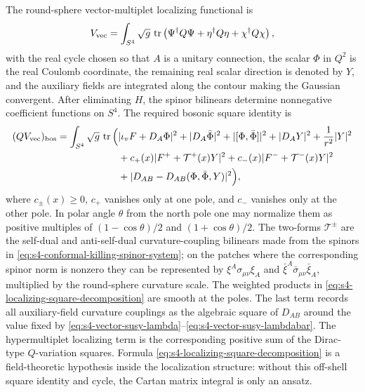 \begin{hypothesis}
\label{hyp:s4-pestun-localizing-cycle}
The round-sphere vector-multiplet localizing functional is
\begin{equation}
  V_{\rm vec}
  =
  \int_{S^4}\sqrt g\,\operatorname{tr}
  \left(
    \Psi^\dagger Q\Psi+\eta^\dagger Q\eta+\chi^\dagger Q\chi
  \right),
  \label{eq:s4-vector-localizing-functional}
\end{equation}
with the real cycle chosen so that \(A\) is a unitary connection, the scalar
\(\Phi\) in \(Q^2\) is the real Coulomb coordinate, the remaining real scalar
direction is denoted by \(Y\), and the auxiliary fields are integrated along
the contour making the Gaussian convergent.  After eliminating \(H\), the
spinor bilinears determine nonnegative coefficient functions on \(S^4\).
The required bosonic square identity is
\begin{equation}
\begin{aligned}
  (QV_{\rm vec})_{\rm bos}
  =
  \int_{S^4}\sqrt g\,\operatorname{tr}\Big(
  &|\iota_vF+D_A\Phi|^2
  +|D_A\bar\Phi|^2
  +|[\Phi,\bar\Phi]|^2
  +|D_A Y|^2+\frac1{r^2}|Y|^2\\
  &+c_+(x)|F^+ + \mathcal T^+(x)Y|^2
  +c_-(x)|F^- + \mathcal T^-(x)Y|^2\\
  &+|D_{AB}-D_{AB}(\Phi,\bar\Phi,Y)|^2
  \Big),
\end{aligned}
  \label{eq:s4-localizing-square-decomposition}
\end{equation}
where \(c_\pm(x)\ge0\), \(c_+\) vanishes only at one pole, and \(c_-\) vanishes
only at the other pole.  In polar angle \(\theta\) from the north pole one may
normalize them as positive multiples of
\((1-\cos\theta)/2\) and \((1+\cos\theta)/2\).  The two-forms
\(\mathcal T^\pm\) are the self-dual and anti-self-dual curvature-coupling
bilinears made from the spinors in
\eqref{eq:s4-conformal-killing-spinor-system}; on the patches where the
corresponding spinor norm is nonzero they can be represented by
\(\xi^A\sigma_{\mu\nu}\xi_A\) and
\(\bar\xi^A\bar\sigma_{\mu\nu}\bar\xi_A\), multiplied by the round-sphere
curvature scale.  The weighted products in
\eqref{eq:s4-localizing-square-decomposition} are smooth at the poles.  The
last term records all auxiliary-field curvature couplings as the algebraic
square of \(D_{AB}\) around the value fixed by
\eqref{eq:s4-vector-susy-lambda}--\eqref{eq:s4-vector-susy-lambdabar}.  The
hypermultiplet localizing term is the corresponding positive sum of the
Dirac-type \(Q\)-variation squares.  Formula
\eqref{eq:s4-localizing-square-decomposition} is a field-theoretic hypothesis
inside the localization structure: without this off-shell square identity and
cycle, the Cartan matrix integral is only an ansatz.
\end{hypothesis}


